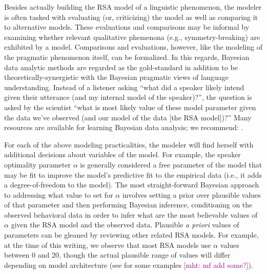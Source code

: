 \documentclass{sp}
\newcommand{\mht}[1]{\textcolor{purple}{[mht: #1]}}
\begin{document}
Besides actually building the RSA model of a linguistic phenomenon, the modeler is often tasked with evaluating (or, criticizing) the model as well as comparing it to alternative models.
These evaluations and comparisons may be informal by examining whether relevant qualitative phemenona (e.g., symmetry-breaking) are exhibited by a model.
Comparisons and evaluations, however, like the modeling of the pragmatic phenomenon itself, can be formalized. 
In this regards, Bayesian data analytic methods are regarded as the gold-standard in addition to be theoretically-synergistic with the Bayesian pragmatic views of language understanding.
Instead of a listener asking ``what did a speaker likely intend given their utterance (and my internal model of the speaker)?'', the question is asked by the scientist ``what is most likely value of these model parameter given the data we've observed (and our model of the data [the RSA model])?''
Many resources are available for learning Bayesian data analysis; we recommend: \cite{gelman2013bayesian, kruschke2014doing, lee2014bayesian}.

For each of the above modeling practicalities, the modeler will find herself with additional decisions about variables of the model. For example, the speaker optimality parameter $\alpha$ is generally considered a free parameter of the model that may be fit to improve the model's predictive fit to the empirical data (i.e., it adds a degree-of-freedom to the model). The most straight-forward Bayesian approach to addressing what value to set for $\alpha$ involves setting a prior over plausible values of that parameter and then performing Bayesian inference, conditioning on the observed behavioral data in order to infer what are the most believable values of $\alpha$ given the RSA model and the observed data. 
Plausible \emph{a priori} values of parameters can be gleaned by reviewing other related RSA models. For example, at the time of this writing, we observe that most RSA models use $\alpha$ values between 0 and 20, though the actual plausible range of values will differ depending on model architecture (see \citealp{tesslergoodman2019, yoonetal2020} for some examples \mht{mf add some?}). 
\end{document}
